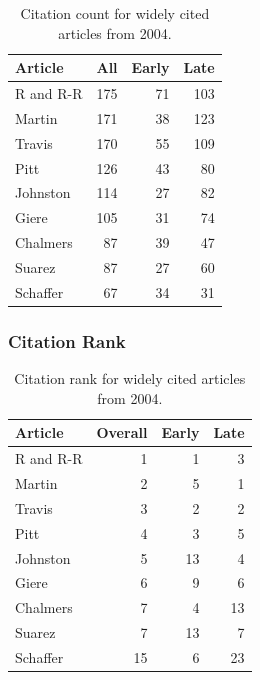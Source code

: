 \documentclass[
  10pt,
  letterpaper,
  DIV=11,
  numbers=noendperiod,
  twoside]{scrartcl}
\begin{document}
\begin{longtable}[]{@{}lrrr@{}}

\caption{\label{tbl-citation-count-2004}Citation count for widely cited
articles from 2004.}

\tabularnewline

\toprule\noalign{}
Article & All & Early & Late \\
\midrule\noalign{}
\endhead
\bottomrule\noalign{}
\endlastfoot
R and R-R & 175 & 71 & 103 \\
Martin & 171 & 38 & 123 \\
Travis & 170 & 55 & 109 \\
Pitt & 126 & 43 & 80 \\
Johnston & 114 & 27 & 82 \\
Giere & 105 & 31 & 74 \\
Chalmers & 87 & 39 & 47 \\
Suarez & 87 & 27 & 60 \\
Schaffer & 67 & 34 & 31 \\

\end{longtable}

\subsubsection*{Citation Rank}\label{sec-rank-2004}

\begin{longtable}[]{@{}lrrr@{}}

\caption{\label{tbl-citation-rank-2004}Citation rank for widely cited
articles from 2004.}

\tabularnewline

\toprule\noalign{}
Article & Overall & Early & Late \\
\midrule\noalign{}
\endhead
\bottomrule\noalign{}
\endlastfoot
R and R-R & 1 & 1 & 3 \\
Martin & 2 & 5 & 1 \\
Travis & 3 & 2 & 2 \\
Pitt & 4 & 3 & 5 \\
Johnston & 5 & 13 & 4 \\
Giere & 6 & 9 & 6 \\
Chalmers & 7 & 4 & 13 \\
Suarez & 7 & 13 & 7 \\
Schaffer & 15 & 6 & 23 \\

\end{longtable}
\end{document}
